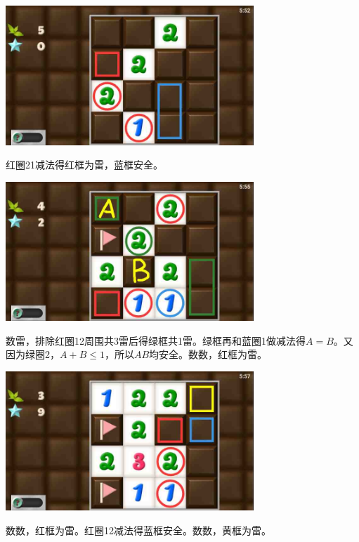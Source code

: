 \subsection{} %
\begin{center}
    \includegraphics[width=0.7\textwidth]{puzzlelow/66-1.jpg}
\end{center}
红圈21减法得红框为雷，蓝框安全。
\begin{center}
    \includegraphics[width=0.7\textwidth]{puzzlelow/66-2.jpg}
\end{center}
数雷，排除红圈12周围共3雷后得绿框共1雷。绿框再和蓝圈1做减法得$A=B$。又因为绿圈2，$A+B\le 1$，所以$AB$均安全。数数，红框为雷。
\begin{center}
    \includegraphics[width=0.7\textwidth]{puzzlelow/66-3.jpg}
\end{center}
数数，红框为雷。红圈12减法得蓝框安全。数数，黄框为雷。

